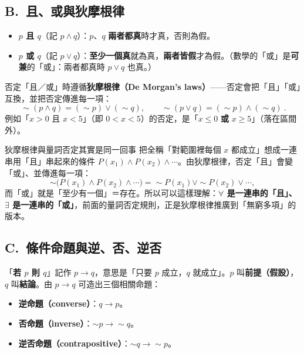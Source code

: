 \documentclass[11pt]{article}
\begin{document}
\subsection*{\sffamily B.\ 且、或與狄摩根律}

\begin{itemize}\setlength{\itemsep}{2pt}
\item \textbf{$p$ 且 $q$}（記 $p\wedge q$）：$p$、$q$ \textbf{兩者都真}時才真，否則為假。
\item \textbf{$p$ 或 $q$}（記 $p\vee q$）：\textbf{至少一個真}就為真，\textbf{兩者皆假}才為假。（數學的「或」是\textbf{可兼}的「或」：兩者都真時 $p\vee q$ 也真。）
\end{itemize}

否定「且／或」時遵循\textbf{狄摩根律（De Morgan's laws）}——否定會把「且」「或」互換，並把否定傳進每一項：
$$
\boxed{\ \sim(p\wedge q)=(\sim p)\vee(\sim q),\qquad \sim(p\vee q)=(\sim p)\wedge(\sim q)\ }.
$$
例如「$x>0$ 且 $x<5$」（即 $0<x<5$）的否定，是「$x\le0$ \textbf{或} $x\ge5$」（落在區間外）。

\begin{補充框}{狄摩根律與量詞否定其實是同一回事}
把全稱「對範圍裡每個 $x$ 都成立」想成一連串用「且」串起來的條件 $P(x_1)\wedge P(x_2)\wedge\cdots$。由狄摩根律，否定「且」會變「或」、並傳進每一項：
$$
\sim\bigl(P(x_1)\wedge P(x_2)\wedge\cdots\bigr)=\sim P(x_1)\vee\sim P(x_2)\vee\cdots,
$$
而「或」就是「至少有一個」＝存在。所以可以這樣理解：\textbf{$\forall$ 是一連串的「且」、$\exists$ 是一連串的「或」}，前面的量詞否定規則，正是狄摩根律推廣到「無窮多項」的版本。
\end{補充框}

\subsection*{\sffamily C.\ 條件命題與逆、否、逆否}

「\textbf{若 $p$ 則 $q$}」記作 $p\to q$，意思是「只要 $p$ 成立，$q$ 就成立」。$p$ 叫\textbf{前提（假設）}，$q$ 叫\textbf{結論}。由 $p\to q$ 可造出三個相關命題：

\begin{itemize}\setlength{\itemsep}{1pt}
\item \textbf{逆命題（converse）}：$q\to p$。
\item \textbf{否命題（inverse）}：$\sim p\to\sim q$。
\item \textbf{逆否命題（contrapositive）}：$\sim q\to\sim p$。
\end{itemize}
\end{document}
